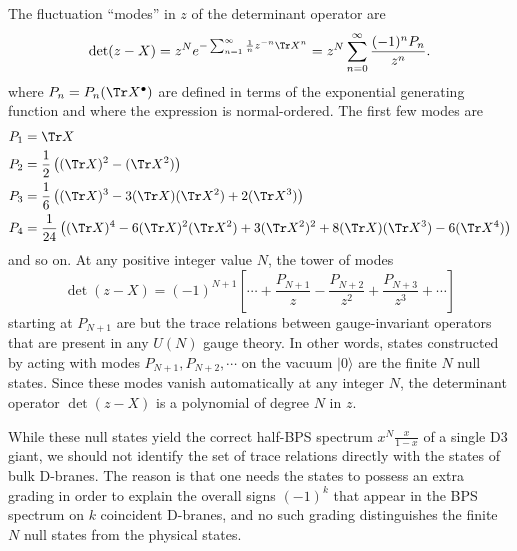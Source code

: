 \documentclass[a4paper,12pt]{article}
\begin{document}
The fluctuation ``modes'' in $z$ of the determinant operator are
\begin{equation}
\det ( z - X) = z^N e^{-\sum_{n=1}^\infty\frac{1}{n} z^{-n} \Tr X^n} = z^N \sum_{n=0}^\infty \frac{(-1)^n P_{n}}{z^{n}}.
\end{equation}
where $P_n = P_n ( \Tr X^{\bullet} )$ are defined in terms of the exponential generating function and where the expression is normal-ordered. The first few modes are
\begin{align}
    P_1 &= \Tr X \nonumber \\
    P_2 &= \frac{1}{2} \left( (\Tr X)^2 - (\Tr X^2) \right) \nonumber \\
    P_3 &= \frac{1}{6} \left( (\Tr X)^3 - 3 (\Tr X) (\Tr X^2) + 2 (\Tr X^3) \right) \nonumber \\
    P_4 &= \frac{1}{24} \left( (\Tr X)^4 - 6 (\Tr X)^2 (\Tr X^2) + 3 (\Tr X^2)^2 + 8 (\Tr X) (\Tr X^3)  - 6 (\Tr X^4) \right)
\end{align}
and so on. At any positive integer value $N$, the tower of modes
\begin{equation}
\det ( z - X) = (-1)^{N+1} \left[ \cdots + \frac{P_{N+1}}{z} - \frac{P_{N+2}}{z^2} + \frac{P_{N+3}}{z^3} + \cdots \right]
\end{equation}
starting at $P_{N+1}$ are but the trace relations between gauge-invariant operators that are present in any $U(N)$ gauge theory. In other words, states constructed by acting with modes $P_{N+1}, P_{N+2}, \cdots$ on the vacuum $|0 \rangle$ are the finite $N$ null states. Since these modes vanish automatically at any integer $N$, the determinant operator $\det (z - X)$ is a polynomial of degree $N$ in $z$.

While these null states yield the correct half-BPS spectrum $x^N \frac{x}{1-x}$ of a single D3 giant, we should not identify the set of trace relations directly with the states of bulk D-branes. The reason is that one needs the states to possess an extra grading in order to explain the overall signs $(-1)^k$ that appear in the BPS spectrum on $k$ coincident D-branes, and no such grading distinguishes the finite $N$ null states from the physical states.
\end{document}
